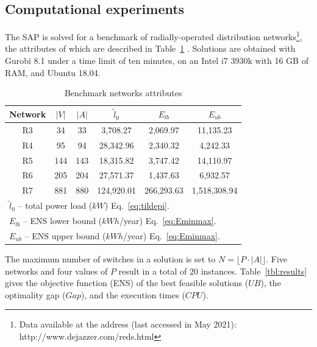 \subsection{Computational experiments} \label{sec:Tests}

The SAP is solved for a benchmark of radially-operated distribution networks\footnote{Data available at the address (last accessed in May 2021): \\ http://www.dejazzer.com/reds.html}, the attributes of which are described in Table~\ref{tbl:networkAttributes} \cite{redes2013}. 
Solutions are obtained with Gurobi 8.1 under a time limit of ten minutes, on an Intel i7 3930k with 16 GB of RAM, and Ubuntu 18.04.


\begin{table}[ht!]
\caption{Benchmark networks attributes} 
\begin{center} {
\begin{tabular}{ c c c c c c } \label{tbl:networkAttributes}
\\
Network & $|V|$ & $|A|$ & $\tilde{l}_0$ & $E_{lb}$ & $E_{ub}$ \\ \hline
R3 & 34 & 33 & 3,708.27 & 2,069.97 & 11,135.23 \\ 
R4 & 95 & 94 & 28,342.96 & 2,340.32 & 4,242.33 \\ 
R5 & 144 & 143 & 18,315.82 & 3,747.42 & 14,110.97 \\ 
R6 & 205 & 204 & 27,571.37 & 1,437.63 & 6,932.57 \\ 
R7 & 881 & 880 & 124,920.01 & 266,293.63 & 1,518,308.94 \\ 
\hline 
\multicolumn{6}{l}{$\tilde{l}_0$ -- total power load ($kW$) Eq.~\eqref{eq:tildepi}.} \\
\multicolumn{6}{l}{$E_{lb}$ -- ENS lower bound ($kWh$/year) Eq.~\eqref{eq:Eminmax}.} \\
\multicolumn{6}{l}{$E_{ub}$ -- ENS upper bound ($kWh$/year) Eq.~\eqref{eq:Eminmax}.}  \\
\end{tabular} }
\end{center} \end{table}


The maximum number of switches in a solution is set to
$N = \lfloor P \cdot |A| \rfloor$. Five networks and four values of $P$ result in a total of $20$ instances. Table~\ref{tbl:results} gives the objective function (ENS) of the best feasible solutions ($UB$), the optimality gap ($Gap$), and the execution times ($CPU$).



